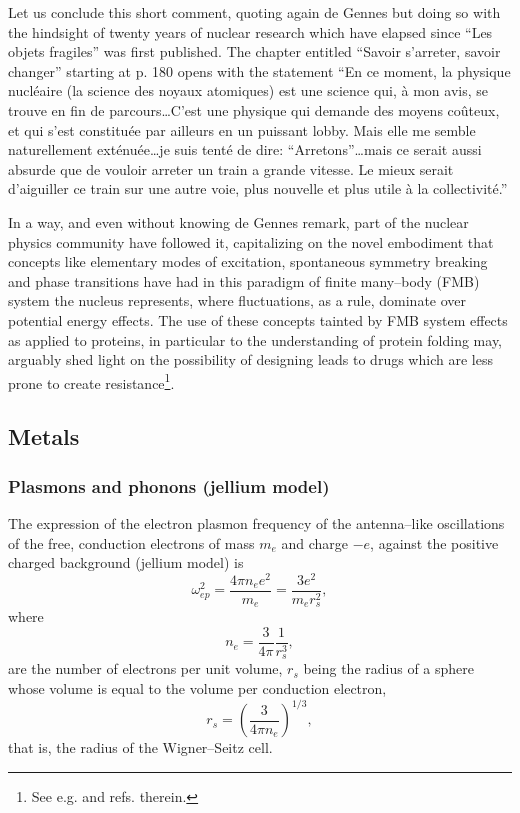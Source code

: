 \begin{subappendices}
 Let us conclude this short comment, quoting again de Gennes but doing so with the hindsight of twenty years of nuclear research which have elapsed since ``Les objets fragiles'' was first published. The chapter entitled  ``Savoir s'arreter, savoir changer'' starting at p. 180 opens with the statement ``En ce moment, la physique nucl\'eaire (la science des noyaux atomiques) est une science qui, \`a mon avis, se trouve en fin de parcours\dots C'est une physique qui demande des moyens co\^uteux, et qui s'est constitu\'ee par ailleurs en un puissant lobby. Mais elle me semble naturellement ext\'enu\'ee\dots je suis tent\'e de dire: ``Arretons''\dots mais ce serait aussi absurde que de vouloir arreter un train a grande vitesse. Le mieux serait d'aiguiller ce train sur une autre voie, plus nouvelle et plus utile \`a la collectivit\'e.''


In a way, and even without knowing de Gennes remark, part of the nuclear physics community have followed it, capitalizing on the novel embodiment that concepts like elementary modes of excitation, spontaneous symmetry breaking and phase transitions have had in this paradigm of finite many--body (FMB) system the nucleus represents, where fluctuations, as a rule, dominate over potential energy effects. The use of these concepts tainted by  FMB system effects as applied to proteins, in particular to the understanding of protein folding may, arguably shed light on the possibility of designing leads to  drugs which are less prone to create resistance\footnote{See e.g. \cite{Broglia:13b} and refs. therein.}.




\subsection{Metals}
\subsubsection{Plasmons and phonons (jellium model)}
The expression of the electron plasmon frequency of the antenna--like oscillations of the free, conduction electrons of mass $m_e$ and charge $-e$, against the positive charged background (jellium model) is
\begin{equation}\label{eq3.A.33}
\omega_{ep}^2=\frac{4\pi n_e e^2}{m_e}=\frac{3e^2}{m_er_s^2},
\end{equation}
where 
\begin{equation}
n_e=\frac{3}{4\pi}\frac{1}{r_s^3},
\end{equation}
are the number of electrons per unit volume, $r_s$ being the radius of a sphere whose volume is equal to the volume per conduction electron,
\begin{equation}
r_s=\left(\frac{3}{4\pi n_e}\right)^{1/3},
\end{equation}
that is, the radius of the Wigner--Seitz cell.



\end{subappendices}
